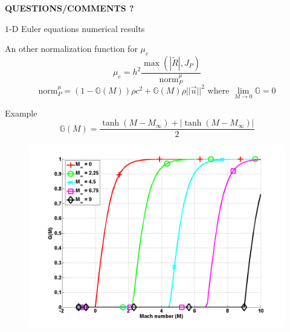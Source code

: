 \documentclass[xcolor=dvipsnames,10pt]{beamer}
\newcommand{\resi}{R}
\newcommand{\resinew}{\widetilde{\resi}}
\newcommand{\norm}{\textrm{norm}}
\begin{document}
\begin{frame}{}
\begin{center}
\LARGE{\textbf{QUESTIONS/COMMENTS ?}}
\end{center}
\end{frame}
\begin{frame}{}
\begin{center}
$1$-D Euler equations numerical results
\end{center}
\end{frame}
\begin{frame}{}
\begin{block}{An other normalization function for $\mu_e$}
\begin{equation}
\mu_e = h^2 \frac{\max \left( |\resinew|, J_P \right)}{\norm_P^\mu} \nonumber
\end{equation}
\begin{equation}
\norm_P^\mu = (1 - \mathbb{G}(M) ) \rho c^2 + \mathbb{G}(M) \rho || \vec{u} ||^2 \text{ where } \lim_{M\to 0} \mathbb{G} = 0\nonumber
\end{equation}
\end{block}
\begin{block}{Example}
\begin{equation}
\mathbb{G}(M) = \frac{\tanh (M-M_\infty) + |\tanh (M-M_\infty)|}{2} \nonumber
\end{equation}
\end{block}
\end{frame}
\begin{frame}
\begin{figure}[H]
\centering
\includegraphics[width=\textwidth]{function_Mach_nb.png}
\end{figure}
\end{frame}
\end{document}
